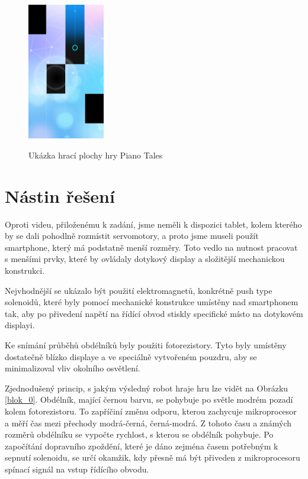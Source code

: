 \documentclass[12pt,oneside]{book} %
\begin{document}
\begin{figure}[h] \large\centering
\includegraphics[width=0.30\textwidth]{./img/pianotales.png}\\[1cm] 
\caption{Ukázka hrací plochy hry Piano Tales}
\label{pianotales}
\end{figure}   
      
\section{Nástin řešení}\label{nastin}
\qquad Oproti videu, přiloženému k zadání, jsme neměli k dispozici tablet, kolem kterého by se dali pohodlně rozmístit servomotory, a proto jsme museli použít smartphone, který má podstatně menší rozměry. Toto vedlo na nutnost pracovat s menšími prvky, které by ovládaly dotykový display a složitější mechanickou konstrukci.

\qquad Nejvhodnější se ukázalo být použití elektromagnetů, konkrétně push type solenoidů, které byly pomocí mechanické konstrukce umístěny nad smartphonem tak, aby po přivedení napětí na řídící obvod stiskly specifické místo na dotykovém displayi.

\qquad Ke snímání průběhů obdélníků byly použiti fotorezistory. Tyto byly umístěny dostatečně blízko displaye a ve speciálně vytvořeném pouzdru, aby se minimalizoval vliv okolního osvětlení. 

\qquad Zjednodušený princip, s jakým výsledný robot hraje hru lze vidět na Obrázku \ref{blok_0}. Obdélník, mající černou barvu, se pohybuje po světle modrém pozadí kolem fotorezistoru. To zapříčiní změnu odporu, kterou zachycuje mikroprocesor a měří čas mezi přechody modrá-černá, černá-modrá. Z tohoto času a známých rozměrů obdélníku se vypočte rychlost, s kterou se obdélník pohybuje. Po započítání dopravního zpoždění, které je dáno zejména časem potřebným k sepnutí solenoidu, se určí okamžik, kdy přesně má být přiveden z mikroprocesoru spínací signál na vstup řídícího obvodu.
\end{document}
